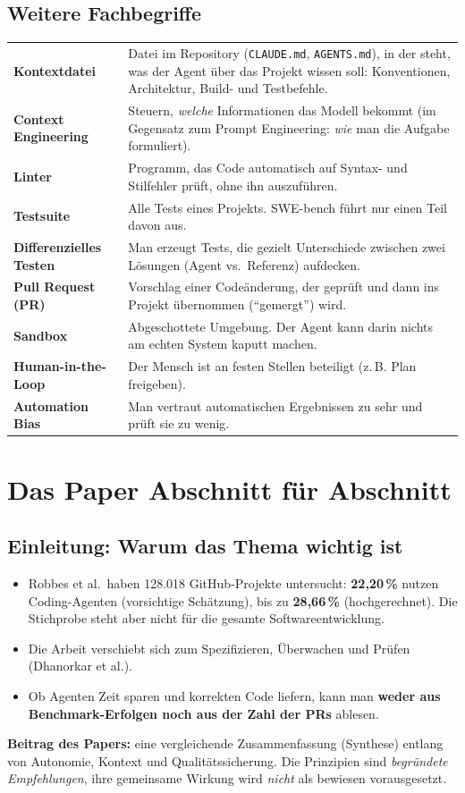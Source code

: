 \documentclass[11pt,a4paper,parskip=half]{scrartcl}
\begin{document}
\subsection{Weitere Fachbegriffe}
\begin{tabularx}{\textwidth}{@{}>{\bfseries}p{3.6cm}L@{}}
\toprule
Kontextdatei & Datei im Repository (\texttt{CLAUDE.md}, \texttt{AGENTS.md}), in der steht, was der Agent über das Projekt wissen soll: Konventionen, Architektur, Build- und Testbefehle. \\
Context Engineering & Steuern, \emph{welche} Informationen das Modell bekommt (im Gegensatz zum Prompt Engineering: \emph{wie} man die Aufgabe formuliert). \\
Linter & Programm, das Code automatisch auf Syntax- und Stilfehler prüft, ohne ihn auszuführen. \\
Testsuite & Alle Tests eines Projekts. SWE-bench führt nur einen Teil davon aus. \\
Differenzielles Testen & Man erzeugt Tests, die gezielt Unterschiede zwischen zwei Lösungen (Agent vs.\ Referenz) aufdecken. \\
Pull Request (PR) & Vorschlag einer Codeänderung, der geprüft und dann ins Projekt übernommen (\enquote{gemergt}) wird. \\
Sandbox & Abgeschottete Umgebung. Der Agent kann darin nichts am echten System kaputt machen. \\
Human-in-the-Loop & Der Mensch ist an festen Stellen beteiligt (z.\,B. Plan freigeben). \\
Automation Bias & Man vertraut automatischen Ergebnissen zu sehr und prüft sie zu wenig. \\
\bottomrule
\end{tabularx}

\section{Das Paper Abschnitt für Abschnitt}

\subsection{Einleitung: Warum das Thema wichtig ist}
\begin{itemize}
\item Robbes et al.\ haben 128.018 GitHub-Projekte untersucht: \textbf{22,20\,\%} nutzen Coding-Agenten (vorsichtige Schätzung), bis zu \textbf{28,66\,\%} (hochgerechnet). Die Stichprobe steht aber nicht für die gesamte Softwareentwicklung.
\item Die Arbeit verschiebt sich zum Spezifizieren, Überwachen und Prüfen (Dhanorkar et al.).
\item Ob Agenten Zeit sparen und korrekten Code liefern, kann man \textbf{weder aus Benchmark-Erfolgen noch aus der Zahl der PRs} ablesen.
\end{itemize}
\textbf{Beitrag des Papers:} eine vergleichende Zusammenfassung (Synthese) entlang von Autonomie, Kontext und Qualitätssicherung. Die Prinzipien sind \emph{begründete Empfehlungen}, ihre gemeinsame Wirkung wird \emph{nicht} als bewiesen vorausgesetzt.
\end{document}
